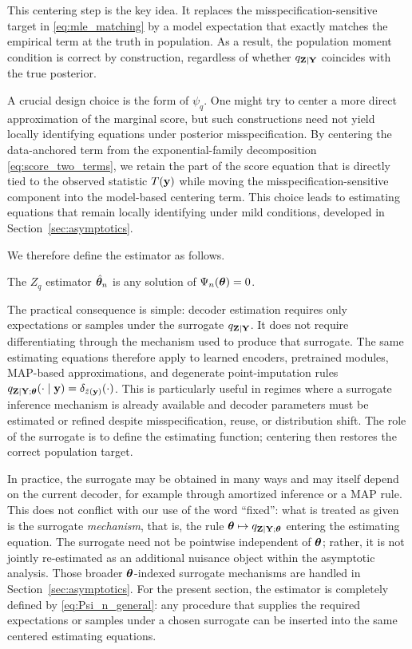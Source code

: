 \documentclass[twoside,11pt]{article}
\begin{document}
This centering step is the key idea. It replaces the misspecification-sensitive target in
\eqref{eq:mle_matching} by a model expectation that exactly matches the empirical term at
the truth in population. As a result, the population moment condition is correct by
construction, regardless of whether $q_{{\bf Z}\mid{\bf Y}}$ coincides with the true posterior.

A crucial design choice is the form of $\psi_q$. One might try to center a more direct
approximation of the marginal score, but such constructions need not yield locally
identifying equations under posterior misspecification. By centering the data-anchored
term from the exponential-family decomposition \eqref{eq:score_two_terms}, we retain the
part of the score equation that is directly tied to the observed statistic $T({\bf y})$ while
moving the misspecification-sensitive component into the model-based centering term. This
choice leads to estimating equations that remain locally identifying under mild conditions,
developed in Section~\ref{sec:asymptotics}.

We therefore define the estimator as follows.

\begin{definition}[$Z_q$ estimator]
\label{def:Zq}
The $Z_q$ estimator $\hat{{\bm{\theta}}}_n$ is any solution of $\Psi_n({\bm{\theta}})=0$.
\end{definition}

The practical consequence is simple: decoder estimation requires only expectations or samples
under the surrogate $q_{{\bf Z}\mid{\bf Y}}$. It does not require differentiating through the mechanism
used to produce that surrogate. The same estimating equations therefore apply to learned
encoders, pretrained modules, MAP-based approximations, and degenerate point-imputation rules
$q_{{\bf Z}\mid{\bf Y};{\bm{\theta}}}(\cdot\mid {\bf y})=\delta_{\tilde z({\bf y})}(\cdot)$. This is particularly useful in
regimes where a surrogate inference mechanism is already available and decoder parameters must
be estimated or refined despite misspecification, reuse, or distribution shift. The role of the
surrogate is to define the estimating function; centering then restores the correct population target.

In practice, the surrogate may be obtained in many ways and may itself depend on the
current decoder, for example through amortized inference or a MAP rule. This does not
conflict with our use of the word ``fixed'': what is treated as given is the surrogate
\emph{mechanism}, that is, the rule ${\bm{\theta}} \mapsto q_{{\bf Z}\mid{\bf Y};{\bm{\theta}}}$ entering the estimating
equation. The surrogate need not be pointwise independent of ${\bm{\theta}}$; rather, it is not
jointly re-estimated as an additional nuisance object within the asymptotic analysis.
Those broader ${\bm{\theta}}$-indexed surrogate mechanisms are handled in
Section~\ref{sec:asymptotics}. For the present section, the estimator is completely defined
by \eqref{eq:Psi_n_general}: any procedure that supplies the required expectations or samples
under a chosen surrogate can be inserted into the same centered estimating equations.
\end{document}
